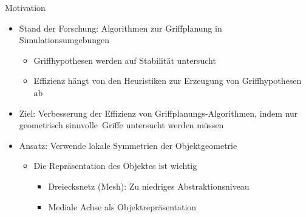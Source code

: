 \documentclass[paper=a4, fontsize=11pt]{scrartcl} %
\numberwithin{equation}{section} %
\numberwithin{figure}{section} %
\numberwithin{table}{section} %
\begin{document}
Motivation
\begin{itemize}
\item Stand der Forschung: Algorithmen zur Griffplanung in Simulationsumgebungen
\begin{itemize}
\item Griffhypothesen werden auf Stabilität untersucht
\item Effizienz hängt von den Heuristiken zur Erzeugung von Griffhypothesen ab
\end{itemize}
\item Ziel: Verbesserung der Effizienz von Griffplanungs-Algorithmen, indem nur \glqq geometrisch sinnvolle\grqq\ Griffe untersucht werden müssen
\item Ansatz: Verwende lokale Symmetrien der Objektgeometrie
\begin{itemize}
\item Die Repräsentation des Objektes ist wichtig
\begin{itemize}
\item Dreiecksnetz (Mesh): Zu niedriges Abstraktionsniveau
\item Mediale Achse als Objektrepräsentation
\end{itemize}
\end{itemize}
\end{itemize}
\end{document}
